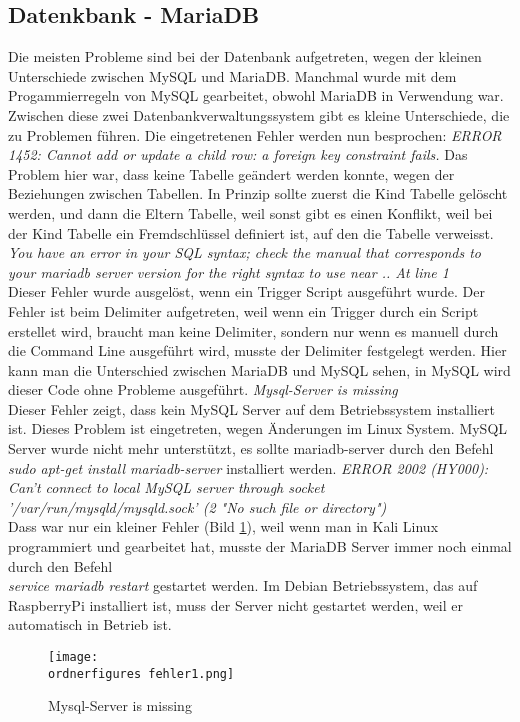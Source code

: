 \subsection{Datenkbank - MariaDB}
Die meisten Probleme sind bei der Datenbank aufgetreten, wegen der kleinen Unterschiede zwischen MySQL und MariaDB. Manchmal wurde mit dem Progammierregeln von MySQL gearbeitet, obwohl MariaDB in Verwendung war. Zwischen diese zwei Datenbankverwaltungssystem gibt es kleine Unterschiede, die zu Problemen führen. Die eingetretenen Fehler werden nun besprochen:
\bigbreak
\textit{ERROR 1452: Cannot add or update a child row: a foreign key constraint fails.}
Das Problem hier war, dass keine Tabelle geändert werden konnte, wegen der Beziehungen zwischen Tabellen. In Prinzip sollte zuerst die Kind Tabelle gelöscht werden, und dann die Eltern Tabelle, weil sonst gibt es einen Konflikt, weil bei der Kind Tabelle ein Fremdschlüssel definiert ist, auf den die Tabelle verweisst.
\bigbreak
\textit{You have an error in your SQL syntax; check the manual that corresponds to your mariadb server version for the right syntax to use near .. At line 1}\\
Dieser Fehler wurde ausgelöst, wenn ein Trigger Script ausgeführt wurde. Der Fehler ist beim Delimiter aufgetreten, weil wenn ein Trigger durch ein Script erstellet wird, braucht man keine Delimiter, sondern nur wenn es manuell durch die Command Line ausgeführt wird, musste der Delimiter festgelegt werden. Hier kann man die Unterschied zwischen MariaDB und MySQL sehen, in MySQL wird dieser Code ohne Probleme ausgeführt.
\bigbreak
\textit{Mysql-Server is missing}\\
Dieser Fehler zeigt, dass kein MySQL Server auf dem Betriebssystem installiert ist. Dieses Problem ist eingetreten, wegen Änderungen im Linux System. MySQL Server wurde nicht mehr unterstützt, es sollte mariadb-server durch den Befehl \textit{sudo apt-get install mariadb-server} installiert werden.
\bigbreak
\textit{ERROR 2002 (HY000): Can't connect to local MySQL server through socket \\'/var/run/mysqld/mysqld.sock' (2 "No such file or directory")}\\
Dass war nur ein kleiner Fehler (Bild \ref{fig:fehler1}), weil wenn man in Kali Linux programmiert und gearbeitet hat, musste der MariaDB Server immer noch einmal durch den Befehl \\ \textit{service mariadb restart} gestartet werden. Im Debian Betriebssystem, das auf RaspberryPi installiert ist, muss der Server nicht gestartet werden, weil er automatisch in Betrieb ist.
\begin{figure}[ht]
  \centering
    \texttt{[image: \\ordnerfigures fehler1.png]}
      \caption{Mysql-Server is missing}
      \label{fig:fehler1}
\end{figure}
